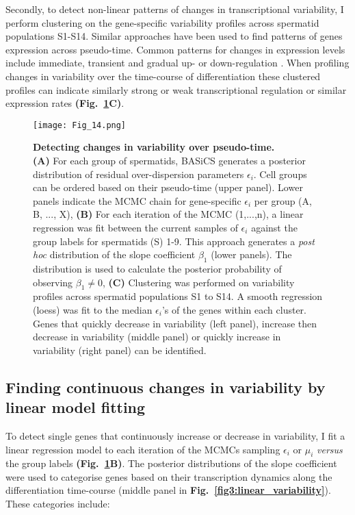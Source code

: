 Secondly, to detect non-linear patterns of changes in transcriptional variability, I perform clustering on the gene-specific variability profiles across spermatid populations S1-S14. 
Similar approaches have been used to find patterns of genes expression across pseudo-time. 
Common patterns for changes in expression levels include immediate, transient and gradual up- or down-regulation \citep{Trapnell2014}. 
When profiling changes in variability over the time-course of differentiation these clustered profiles can indicate similarly strong or weak transcriptional regulation or similar expression rates \textbf{(Fig.~\ref{fig3:variability_schematic}C)}.

\newpage

\begin{figure}[!h]
\centering
\texttt{[image: Fig\_14.png]}
\caption[Detecting changes in variability over pseudo-time]{\textbf{Detecting changes in variability over pseudo-time.}\\
\textbf{(A)} For each group of spermatids, BASiCS  generates a posterior distribution of residual over-dispersion parameters $\epsilon_i$. 
Cell groups can be ordered based on their pseudo-time (upper panel). Lower panels indicate the MCMC chain for gene-specific $\epsilon_i$ per group (A, B, ..., X), 
\textbf{(B)} For each iteration of the MCMC (1,...,n), a linear regression was fit between the current samples of $\epsilon_i$ against the group labels for spermatids (S) 1-9. 
This approach generates a \emph{post hoc} distribution of the slope coefficient $\beta_1$ (lower panels). 
The distribution is used to calculate the posterior probability of observing $\beta_1\neq0$, 
\textbf{(C)} Clustering was performed on variability profiles across spermatid populations S1 to S14. A smooth regression (loess) was fit to the median $\epsilon_i$'s of the genes within each cluster. 
Genes that quickly decrease in variability (left panel), increase then decrease in variability (middle panel) or quickly increase in variability (right panel) can be identified.}
\label{fig3:variability_schematic}
\end{figure}

\newpage

\subsection{Finding continuous changes in variability by linear model fitting}

To detect single genes that continuously increase or decrease in variability, I fit a linear regression model to each iteration of the MCMCs sampling $\epsilon_i$ or $\mu_i$ \emph{versus} the group labels \textbf{(Fig.~\ref{fig3:variability_schematic}B)}. 
The posterior distributions of the slope coefficient were used to categorise genes based on their transcription dynamics along the differentiation time-course (middle panel in \textbf{Fig.~\ref{fig3:linear_variability}}). 
These categories include: 

